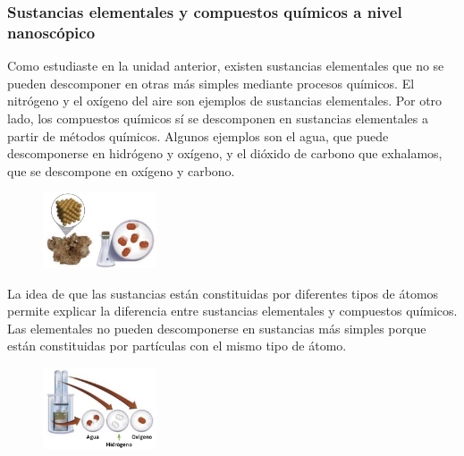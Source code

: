 \documentclass[11pt]{book}
\begin{document}
\subsubsection{Sustancias elementales y compuestos químicos a nivel nanoscópico}

Como estudiaste en la unidad anterior, existen sustancias elementales que no se pueden descomponer
en otras más simples mediante procesos químicos. El nitrógeno y el oxígeno del aire son
ejemplos de sustancias elementales. Por otro lado, los compuestos
químicos sí se descomponen en sustancias elementales a partir
de métodos químicos. Algunos ejemplos son el agua, que puede
descomponerse en hidrógeno y oxígeno, y el dióxido de carbono
que exhalamos, que se descompone en oxígeno y carbono.\\

\begin{figure}
  \centering
  \includegraphics[width=0.3\textwidth]{atomos03.png}
  \label{fig:atomos03}
\end{figure}

La idea de que las sustancias están constituidas por diferentes
tipos de átomos permite explicar la diferencia entre sustancias elementales y
compuestos químicos. Las elementales no pueden descomponerse en sustancias más simples porque están constituidas
por partículas con el mismo tipo de átomo.\\

\begin{figure}
  \centering
  \includegraphics[width=0.3\textwidth]{atomos04.png}
  \label{fig:atomos04}
\end{figure}
\end{document}
